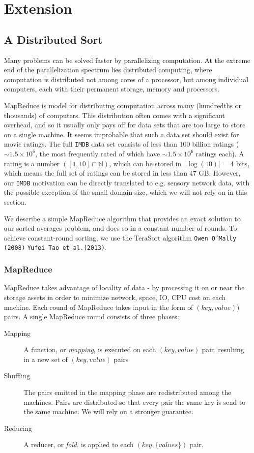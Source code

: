 \chapter{Extension}
\section{A Distributed Sort}
Many problems can be solved faster by parallelizing computation. At the extreme
end of the parallelization spectrum lies distributed computing, where
computation is distributed not among cores of a processor, but among individual
computers, each with their permanent storage, memory and processors.

MapReduce is model for distributing computation across many (hundredths or
thousands) of computers. This distribution often comes with a significant
overhead, and so it usually only pays off for data sets that are too large to
store on a single machine. It seems improbable that such a data set should exist
for movie ratings. The full \texttt{IMDB} data set consists of less than
100 billion ratings ($\sim 1.5 \times 10^6$, the most frequently rated of which
have $\sim 1.5 \times 10^6$ ratings each). A rating is a number
$\left(\left[1,10\right]\cap \mathbb{N}\right)$, which can be stored in
$\lceil \log(10)\rceil = 4$ bits, which means the full set of ratings can be
stored in less than $47$ GB. However, our \texttt{IMDB} motivation can be
directly translated to e.g. sensory network data, with the possible exception of
the small domain size, which we will not rely on in this section.

We describe a simple MapReduce algorithm that provides an exact solution to our
sorted-averages problem, and does so in a constant number of rounds. To achieve
constant-round sorting, we use the TeraSort algorithm \texttt{Owen O'Mally
(2008)}\citep{terabytesort} \texttt{Yufei Tao et
al.(2013)}\citep{minimalmapreduce}.

\subsection{MapReduce}
\label{sec:mapreduce}
MapReduce takes advantage of locality of data - by processing it on 
or near the storage assets in order to minimize network, space, IO, CPU cost on each machine.
Each round of MapReduce takes input in the form of $(key,value)$) pairs.
A single MapReduce round consists of three phases:

\begin{description}
	\item [Mapping] A function, or \textit{mapping}, is executed on each $(key,
		value)$ pair, resulting in a new set of $(key,value)$ pairs
	\item [Shuffling] The pairs emitted in the mapping phase are redistributed among
		the machines. Pairs are distributed so that every pair the
		same key is send to the same machine. We will rely on a stronger
		guarantee.
	\item [Reducing] A reducer, or \textit{fold}, is applied to each $(key,
		\{values\})$ pair.
\end{description}

